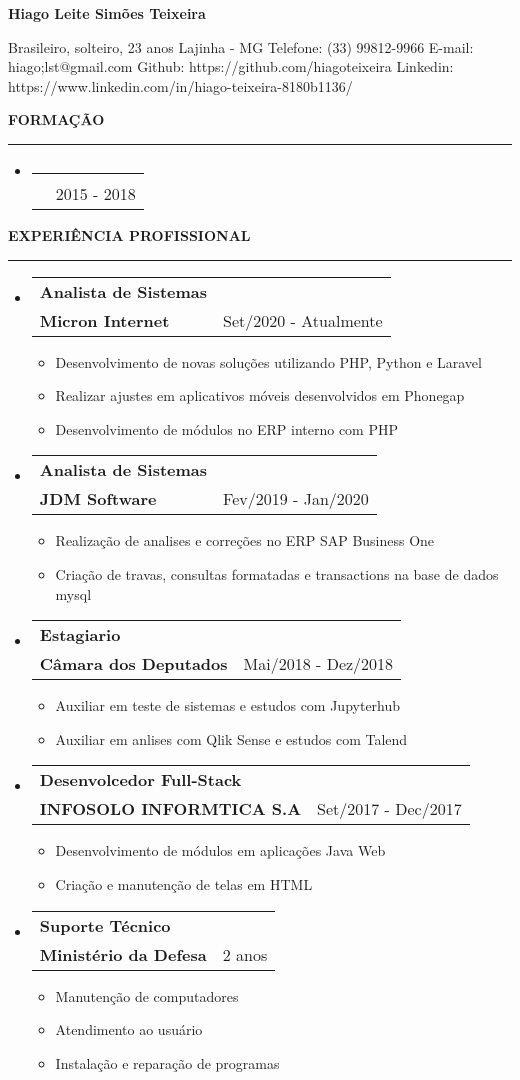 \documentclass[a4paper,10pt]{article}
\makeatletter
\newcommand{\EducationItem}[3]{
    \item
    \begin{tabular*}{0.93\textwidth}[t]{l@{\extracolsep{\fill}}r}
        \normalfont{#1} & \\
        \small\normalfont{#2} & \scriptsize#3
    \end{tabular*}
}
\newcommand{\WorkExpItem}[3]{
    \item
        \begin{tabular*}{0.93\textwidth}[t]{l@{\extracolsep{\fill}}r}
            \textbf{#1} & \\
            \small\textbf{#2} & \scriptsize#3 \\
        \end{tabular*}
}
\newcommand{\WorkExpActivitiesBegin}[0]{
    \vspace{-5pt}\begin{itemize}
}
\newcommand{\WorkExpActivitiesItem}[1]{
    \vspace{-2pt}\item[]\small #1
}
\newcommand{\WorkExpActivitiesEnd}[0]{
    \end{itemize}\vspace{-7pt}
}
\newcommand{\SectionTitle}[1]{
    \begin{flushleft}
    \textbf{#1}
    \noindent\textcolor{gray}{\rule{18.5cm}{1px}}
    \end{flushleft}
}
\newcommand{\SectionBegin}[0]{
    \vspace{-16pt}\begin{flushleft}
    \begin{itemize}
}
\newcommand{\SectionEnd}[0]{
    \end{itemize}
    \end{flushleft}\vspace{-2pt}
}
\newcommand{\PersonInformation}[7]{
    \begin{flushleft}
        \begin{LARGE}
            \textbf{#1}
        \end{LARGE}
    \end{flushleft}

    \begin{flushleft}
        #2
        \newline
        #3
        \newline
        Telefone: #4
        \newline
        E-mail: #5
        \newline
        Github: #6
        \newline
        Linkedin: #7
        \newline
    \end{flushleft}
}
\makeatother
\begin{document}

\PersonInformation
    {Hiago Leite Simões Teixeira}
    {Brasileiro, solteiro, 23 anos}
    {Lajinha - MG}
    {(33) 99812-9966}
    {hiago;lst@gmail.com}
    {https://github.com/hiagoteixeira}
    {https://www.linkedin.com/in/hiago-teixeira-8180b1136/}

\SectionTitle
    {FORMA\c{C}\~{A}O}
\SectionBegin
    \EducationItem
        {Bacharel em Ci\^{e}ncia da Computa\c{c}\~{a}o}
        {Centro Universit\´{a}rio de Bras\´{i}lia - UniCEUB}
        {2015 - 2018}
\SectionEnd

\SectionTitle
    {EXPERI\^{E}NCIA PROFISSIONAL}
\SectionBegin
    \WorkExpItem
        {Analista de Sistemas}
        {Micron Internet}
        {Set/2020 - Atualmente}
        \WorkExpActivitiesBegin
            \WorkExpActivitiesItem{Desenvolvimento de novas solu\c{c}\~{o}es utilizando PHP, Python e Laravel}
            \WorkExpActivitiesItem{Realizar ajustes em aplicativos móveis desenvolvidos em Phonegap}
            \WorkExpActivitiesItem{Desenvolvimento de módulos no ERP interno com PHP}
        \WorkExpActivitiesEnd
    \WorkExpItem
        {Analista de Sistemas}
        {JDM Software}
        {Fev/2019 - Jan/2020}
        \WorkExpActivitiesBegin
            \WorkExpActivitiesItem{Realiza\c{c}\~{a}o de analises e corre\c{c}\~{o}es no ERP SAP Business One}
            \WorkExpActivitiesItem{Cria\c{c}\~{a}o de travas, consultas formatadas e transactions na base de dados mysql}
        \WorkExpActivitiesEnd
    \WorkExpItem
        {Estagiario}
        {C\^{a}mara dos Deputados}
        {Mai/2018 - Dez/2018}
        \WorkExpActivitiesBegin
            \WorkExpActivitiesItem{Auxiliar em teste de sistemas e estudos com Jupyterhub}
            \WorkExpActivitiesItem{Auxiliar em anlises com Qlik Sense e estudos com Talend}
        \WorkExpActivitiesEnd
    \WorkExpItem
        {Desenvolcedor Full-Stack}
        {INFOSOLO INFORM\´{A}TICA S.A}
        {Set/2017 - Dec/2017}
        \WorkExpActivitiesBegin
            \WorkExpActivitiesItem{Desenvolvimento de módulos em aplicações Java Web}
            \WorkExpActivitiesItem{Criação e manutenção de telas em HTML}
        \WorkExpActivitiesEnd
    \WorkExpItem
        {Suporte Técnico}
        {Ministério da Defesa}
        {2 anos}
        \WorkExpActivitiesBegin
            \WorkExpActivitiesItem{Manutenção de computadores}
            \WorkExpActivitiesItem{Atendimento ao usuário}
            \WorkExpActivitiesItem{Instalação e reparação de programas}
        \WorkExpActivitiesEnd
\SectionEnd
\end{document}
